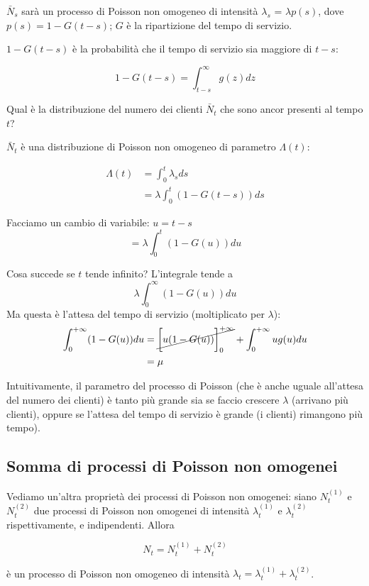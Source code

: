 \documentclass[a4paper,12pt]{book}
\begin{document}
$ \bar{N}_s $ sarà un processo di Poisson non omogeneo di intensità $\lambda_s$ = $\lambda p(s)$, dove $ p(s) = 1 - G(t-s) $; $ G $ è la ripartizione del tempo di servizio.

$ 1 - G(t - s) $ è la probabilità che il tempo di servizio sia maggiore di $ t - s $:

$$ 1 - G(t-s) = \int_{t-s}^{\infty} g(z) dz $$

Qual è la distribuzione del numero dei clienti $ \bar{N}_t $ che sono ancor presenti al tempo $ t $?

$ \bar{N}_t $ è una distribuzione di Poisson non omogeneo di parametro $\Lambda(t)$:

\begin{align*}
	\Lambda(t) & = \int_{0}^{t}\lambda_s ds \\
	& = \lambda \int_{0}^{t} (1 - G(t-s)) ds
\end{align*}

Facciamo un cambio di variabile: $ u = t-s $
$$ = \lambda\int_{0}^{t}( 1 - G(u)) du $$

Cosa succede se $ t $ tende infinito? L'integrale tende a 
$$ \lambda \int_0^{\infty} ( 1 - G(u)) du $$
Ma questa è l'attesa del tempo di servizio (moltiplicato per $\lambda$):
\begin{align*}
	\int_{0}^{+\infty} ( 1 - G(u)) du  & = \cancel{\bigg[ u( 1 - G(u)) \bigg]_0^{+\infty}} + \int_{0}^{+\infty} ug(u) du \\
	& = \mu
\end{align*}

Intuitivamente, il parametro del processo di Poisson (che è anche uguale all'attesa del numero dei clienti) è tanto più grande sia se faccio crescere $\lambda$ (arrivano più clienti), oppure se l'attesa del tempo di servizio è grande (i clienti) rimangono più tempo).

\subsection{Somma di processi di Poisson non omogenei}
Vediamo un'altra proprietà dei processi di Poisson non omogenei: siano $ N_t^{(1)} $ e $ N_t^{(2)} $ due processi di Poisson non omogenei di intensità $\lambda_t^{(1)}$ e $ \lambda_t^{(2)} $ rispettivamente, e indipendenti. Allora

$$ N_t = N_t^{(1)} + N_t^{(2)} $$

è un processo di Poisson non omogeneo di intensità $ \lambda_t = \lambda_t^{(1)} + \lambda_t^{(2)} $.
\end{document}
